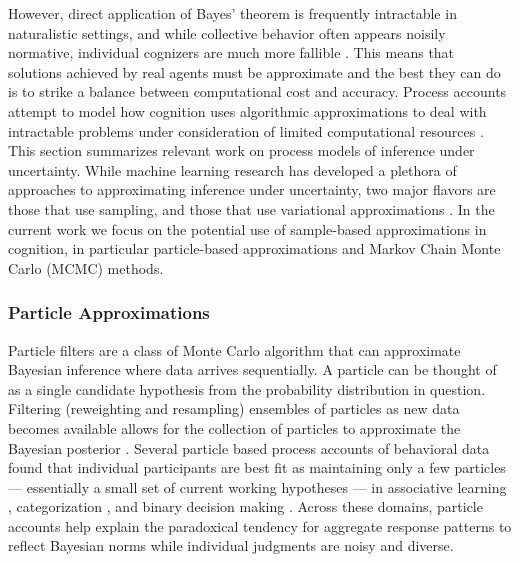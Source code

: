 \documentclass[doc,natbib,floatsintext]{apa7}
\begin{document}
However, direct application of Bayes' theorem is frequently intractable in naturalistic settings, and while collective behavior often appears noisily normative, individual cognizers are much more fallible \citep{jones2011bayesian}. This means that solutions achieved by real agents must be approximate and the best they can do is to strike a balance between computational cost and accuracy. 
Process accounts attempt to model how cognition uses algorithmic approximations to deal with intractable problems under consideration of limited computational resources \citep{griffiths2012bridging, sanborn2010rational,van2019cognition}. This section summarizes relevant work on process models of inference under uncertainty. While machine learning research has developed a plethora of approaches to approximating inference under uncertainty, two major flavors are those that use sampling, and those that use variational approximations \citep{sanborn2017types}. In the current work we focus on the potential use of sample-based approximations in cognition, in particular particle-based approximations and Markov Chain Monte Carlo (MCMC) methods.

\subsubsection{Particle Approximations}
Particle filters are a class of Monte Carlo algorithm that can approximate Bayesian inference where data arrives sequentially. A particle can be thought of as a single candidate hypothesis from the probability distribution in question. Filtering (reweighting and resampling) ensembles of particles as new data becomes available allows for the collection of particles to approximate the Bayesian posterior \citep{sanborn2010rational}. Several particle based process accounts of behavioral data found that individual participants are best fit as maintaining only a few particles --- essentially a small set of current working hypotheses --- in associative learning \citep{daw2008pigeon}, categorization \citep{sanborn2010rational}, and binary decision making \citep{vul2014one}. Across these domains, particle accounts help explain the paradoxical tendency for aggregate response patterns to reflect Bayesian norms while individual judgments are noisy and diverse.
\end{document}
